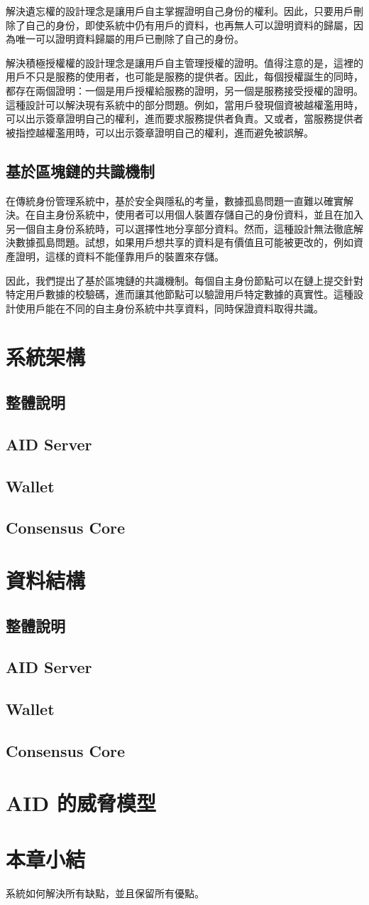 解決遺忘權的設計理念是讓用戶自主掌握證明自己身份的權利。因此，只要用戶刪除了自己的身份，即使系統中仍有用戶的資料，也再無人可以證明資料的歸屬，因為唯一可以證明資料歸屬的用戶已刪除了自己的身份。

解決積極授權權的設計理念是讓用戶自主管理授權的證明。值得注意的是，這裡的用戶不只是服務的使用者，也可能是服務的提供者。因此，每個授權誕生的同時，都存在兩個證明：一個是用戶授權給服務的證明，另一個是服務接受授權的證明。這種設計可以解決現有系統中的部分問題。例如，當用戶發現個資被越權濫用時，可以出示簽章證明自己的權利，進而要求服務提供者負責。又或者，當服務提供者被指控越權濫用時，可以出示簽章證明自己的權利，進而避免被誤解。
\subsection{基於區塊鏈的共識機制}
在傳統身份管理系統中，基於安全與隱私的考量，數據孤島問題一直難以確實解決。在自主身份系統中，使用者可以用個人裝置存儲自己的身份資料，並且在加入另一個自主身份系統時，可以選擇性地分享部分資料。然而，這種設計無法徹底解決數據孤島問題。試想，如果用戶想共享的資料是有價值且可能被更改的，例如資產證明，這樣的資料不能僅靠用戶的裝置來存儲。

因此，我們提出了基於區塊鏈的共識機制。每個自主身份節點可以在鏈上提交針對特定用戶數據的校驗碼，進而讓其他節點可以驗證用戶特定數據的真實性。這種設計使用戶能在不同的自主身份系統中共享資料，同時保證資料取得共識。
\section{系統架構}
\subsection{整體說明}
\subsection{AID Server}
\subsection{Wallet}
\subsection{Consensus Core}
\section{資料結構}
\subsection{整體說明}
\subsection{AID Server}
\subsection{Wallet}
\subsection{Consensus Core}
\section{AID 的威脅模型}
\section{本章小結}
系統如何解決所有缺點，並且保留所有優點。
